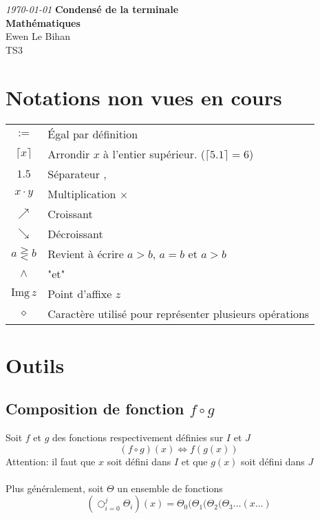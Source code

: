 \documentclass{article}
\newcommand{\img}{\text{Img}\,}
\newcommand{\placeholder}{\diamond}
\begin{document}
\begin{titlepage}
\begin{center}
\textit{\today}
\vfill
\textbf{\LARGE{Condensé de la terminale}\\\Large{Mathématiques}}\\
\vfill
\large{Ewen Le Bihan\\TS3}
\end{center}
\end{titlepage}
\section*{Notations non vues en cours}
\begin{tabular}{c|l}
	$:=$ & Égal par définition\\
	$\lceil x \rceil$ & Arrondir $x$ à l'entier supérieur. ($\lceil 5.1 \rceil = 6$)\\
	$1.5$ & Séparateur ,\\
	$x\cdot y$ & Multiplication $\times$\\
	$\nearrow$ & Croissant\\
	$\searrow$ & Décroissant \\
	$a \gtreqless b$ & Revient à écrire $a > b$, $a = b$ et $a > b$ \\
	$\land$ & "et"\\
	$\img z$ & Point d'affixe $z$\\
	$\placeholder$ & Caractère utilisé pour représenter plusieurs opérations\\
\end{tabular}
\pagestyle{empty}
\newpage
\tableofcontents
\pagestyle{empty}
\newpage

\setcounter{section}{-1}

\section{Outils}
\subsection{Composition de fonction $f \circ g$}
Soit $f$ et $g$ des fonctions respectivement définies sur $I$ et $J$
\[(f \circ g)(x) \iff f(g(x))\]
Attention: il faut que $x$ soit défini dans $I$ et que $g(x)$ soit défini dans $J$\\\\

Plus généralement, soit $\Theta$ un ensemble de fonctions
\[\left(\bigcirc_{i=0}^{j} \Theta_i\right)(x) = \Theta_0 ( \Theta_1 ( \Theta_2 ( \Theta_3 \dots ( x \dots )\]
\end{document}
